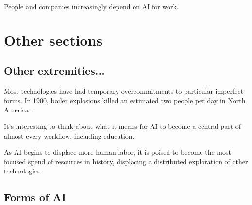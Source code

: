 People and companies increasingly depend on AI for work. 


\section{Other sections}

\subsection{Other extremities...}

Most technologies have had temporary overcommitments to particular imperfect forms. In 1900, boiler explosions killed an estimated two people per day in North America \citep{cepforensic2021keeping}. 

It's interesting to think about what it means for AI to become a central part of almost every workflow, including education. 

As AI begins to displace more human labor, it is poised to become the most focused spend of resources in history, displacing a distributed exploration of other technologies.




\subsection{Forms of AI}

